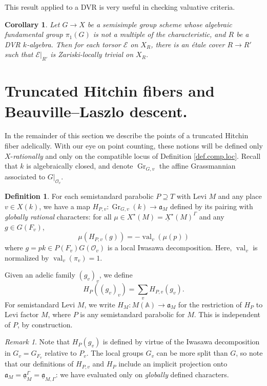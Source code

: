 \documentclass[openany]{amsbook}
\newtheorem{corollary}[theorem]{Corollary}
\theoremstyle{definition}
\newtheorem{definition}[theorem]{Definition}
\theoremstyle{remark}
\newtheorem{remark}[theorem]{Remark}
\numberwithin{equation}{section}
\renewcommand{\O}{\mathcal{O}}
\newcommand{\cE}{\mathcal{E}}
\newcommand{\A}{\mathbb{A}}
\newcommand{\ul}[1]{\underline{#1}}
\newcommand{\val}{\on{val}}
\renewcommand{\-}{\operatorname{-}}
\renewcommand{\a}{\mathfrak{a}}
\newcommand{\on}[1]{\operatorname{#1}}
\renewcommand{\A}{\mathbb{A}}
\newcommand{\Gr}{\on{Gr}}
\begin{document}
This result applied to a DVR is very useful in checking valuative criteria.
\begin{corollary}\label{cor.dvr.Zar.loc.triv}
    Let $G \to X$ be a semisimple group scheme whose algebraic fundamental group $\pi_1(G)$ is not a multiple of the characteristic, and $R$ be a DVR $k$-algebra. Then for each torsor $\cE$ on $X_R$, there is an \'etale cover $R \to R'$ such that $\cE|_{R'}$ is Zariski-locally trivial on $X_R$.
\end{corollary}








\section{Truncated Hitchin fibers and Beauville--Laszlo descent.}\label{subsect.adelic.trunc.Hitchin}
In the remainder of this section we describe the points of a truncated Hitchin fiber adelically. With our eye on point counting, these notions will be defined only $X$-\textit{rationally} and only on the compatible locus of Definition \ref{def.comp.loc}. Recall that $k$ is algebraically closed, and denote $\Gr_{G,v}$ the affine Grassmannian associated to $G|_{\O_v}$.

\begin{definition}\label{def.adelic.hitchin.deg}
    For each semistandard parabolic $P \supseteq T$ with Levi $M$ and any place $v \in X(k)$, we have a map $H_{P,v} : \Gr_{G,v}(k) \to \a_M$ defined by its pairing with \textit{globally rational} characters: for all $\mu \in X^\star(M) = \ul{X}^\star(M)^\Gamma$ and any $g \in G(F_v)$,
    \[
        \mu(H_{P,v}(g)) = -\val_v(\mu(p))
    \]
    where $g = pk \in P(F_v) G(\O_v)$ is a local Iwasawa decomposition. Here, $\val_v$ is normalized by $\val_v(\pi_v) = 1$.

    Given an adelic family $(g_v)_v$, we define 
    $$
        H_P((g_v)_v) = \sum_v H_{P,v}(g_v).
    $$
    For semistandard Levi $M$, we write $H_M : M(\A) \to \a_M$ for the restriction of $H_P$ to Levi factor $M$, where $P$ is any semistandard parabolic for $M$. This is independent of $P$, by construction. 
\end{definition}


\begin{remark}      
    Note that $H_P(g_v)$ is defined by virtue of the Iwasawa decomposition in $G_{v} = G_{F_v}$ relative to $P_v$. The local groups $G_{v}$ can be more split than $G$, so note that our definitions of $H_{P,v}$ and $H_P$ include an implicit projection onto $\a_M = \ul{\a}_M^\Gamma = \ul{\a}_{M,\Gamma}$: we have evaluated only on \textit{globally} defined characters.
\end{remark}
\end{document}

